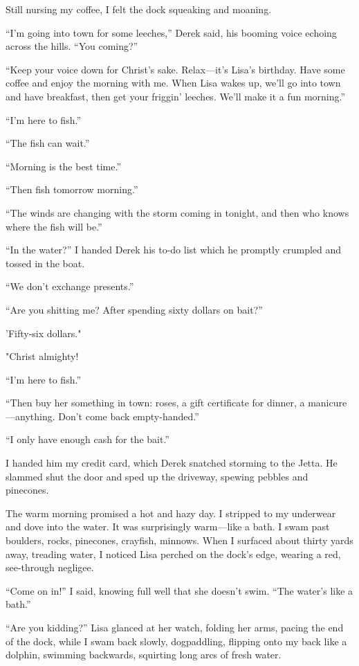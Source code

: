 Still nursing my coffee, I felt the dock squeaking and moaning.

``I'm going into town for some leeches,'' Derek said, his booming voice
echoing across the hills. ``You coming?''

``Keep your voice down for Christ's sake. Relax---it's Lisa's birthday.
Have some coffee and enjoy the morning with me. When Lisa wakes up,
we'll go into town and have breakfast, then get your friggin' leeches.
We'll make it a fun morning.''

``I'm here to fish.''

``The fish can wait.''

``Morning is the best time.''

``Then fish tomorrow morning.''

``The winds are changing with the storm coming in tonight, and then who
knows where the fish will be.''

``In the water?'' I handed Derek his to-do list which he promptly
crumpled and tossed in the boat.

``We don't exchange presents.''

``Are you shitting me? After spending sixty dollars on bait?''

'Fifty-six dollars."

"Christ almighty!

``I'm here to fish.''

``Then buy her something in town: roses, a gift certificate for dinner,
a manicure---anything. Don't come back empty-handed.''

``I only have enough cash for the bait.''

I handed him my credit card, which Derek snatched storming to the Jetta.
He slammed shut the door and sped up the driveway, spewing pebbles and
pinecones.

The warm morning promised a hot and hazy day. I stripped to my underwear
and dove into the water. It was surprisingly warm---like a bath. I swam
past boulders, rocks, pinecones, crayfish, minnows. When I surfaced
about thirty yards away, treading water, I noticed Lisa perched on the
dock's edge, wearing a red, see-through negligee.

``Come on in!'' I said, knowing full well that she doesn't swim. ``The
water's like a bath.''

``Are you kidding?'' Lisa glanced at her watch, folding her arms, pacing
the end of the dock, while I swam back slowly, dogpaddling, flipping
onto my back like a dolphin, swimming backwards, squirting long arcs of
fresh water.


